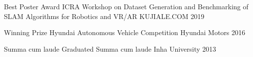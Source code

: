 
\begin{cvhonors}
  \cvhonor
    {Best Poster Award} %
    {ICRA Workshop on Dataset Generation and Benchmarking of SLAM Algorithms for Robotics and VR/AR} %
    {KUJIALE.COM} %
    {2019} %

  \cvhonor
    {Winning Prize} %
    {Hyundai Autonomous Vehicle Competition} %
    {Hyundai Motors} %
    {2016} %

  \cvhonor
    {Summa cum laude} %
    {Graduated Summa cum laude} %
    {Inha University} %
    {2013} %
 
\end{cvhonors}
